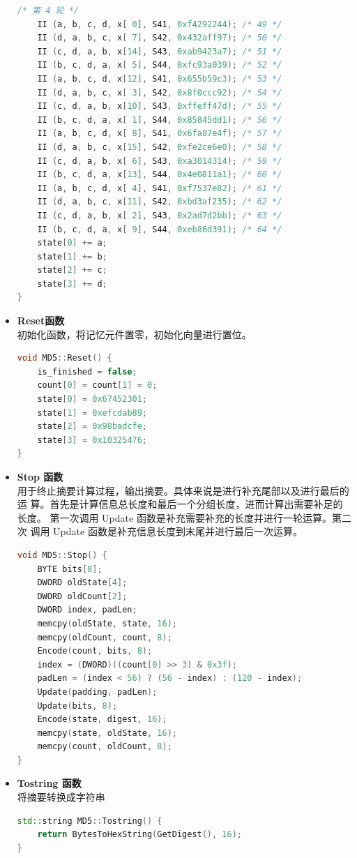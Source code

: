 \documentclass[UTF8,a4paper,10pt]{ctexart}
\begin{document}
\begin{itemize}
\begin{lstlisting}[language = C++]
	/* 第 4 轮 */
	II (a, b, c, d, x[ 0], S41, 0xf4292244); /* 49 */
	II (d, a, b, c, x[ 7], S42, 0x432aff97); /* 50 */
	II (c, d, a, b, x[14], S43, 0xab9423a7); /* 51 */
	II (b, c, d, a, x[ 5], S44, 0xfc93a039); /* 52 */
	II (a, b, c, d, x[12], S41, 0x655b59c3); /* 53 */
	II (d, a, b, c, x[ 3], S42, 0x8f0ccc92); /* 54 */
	II (c, d, a, b, x[10], S43, 0xffeff47d); /* 55 */
	II (b, c, d, a, x[ 1], S44, 0x85845dd1); /* 56 */
	II (a, b, c, d, x[ 8], S41, 0x6fa87e4f); /* 57 */
	II (d, a, b, c, x[15], S42, 0xfe2ce6e0); /* 58 */
	II (c, d, a, b, x[ 6], S43, 0xa3014314); /* 59 */
	II (b, c, d, a, x[13], S44, 0x4e0811a1); /* 60 */
	II (a, b, c, d, x[ 4], S41, 0xf7537e82); /* 61 */
	II (d, a, b, c, x[11], S42, 0xbd3af235); /* 62 */
	II (c, d, a, b, x[ 2], S43, 0x2ad7d2bb); /* 63 */
	II (b, c, d, a, x[ 9], S44, 0xeb86d391); /* 64 */
    state[0] += a;
    state[1] += b;
    state[2] += c;
    state[3] += d;
}
    \end{lstlisting}
    \item \textbf{Reset函数}\\
    初始化函数，将记忆元件置零，初始化向量进行置位。
    \begin{lstlisting}[language = C++]
void MD5::Reset() {
	is_finished = false;
	count[0] = count[1] = 0;
	state[0] = 0x67452301;
	state[1] = 0xefcdab89;
	state[2] = 0x98badcfe;
	state[3] = 0x10325476;
}
    \end{lstlisting}
    \item \textbf{Stop 函数}\\ 
    用于终止摘要计算过程，输出摘要。具体来说是进行补充尾部以及进行最后的运 算。首先是计算信息总长度和最后一个分组长度，进而计算出需要补足的长度。 第一次调用 Update 函数是补充需要补充的长度并进行一轮运算。第二次 调用 Update 函数是补充信息长度到末尾并进行最后一次运算。
    \begin{lstlisting}[language = C++]
void MD5::Stop() {
	BYTE bits[8];
	DWORD oldState[4];
	DWORD oldCount[2];
	DWORD index, padLen;
	memcpy(oldState, state, 16);
	memcpy(oldCount, count, 8);
	Encode(count, bits, 8);
	index = (DWORD)((count[0] >> 3) & 0x3f);
	padLen = (index < 56) ? (56 - index) : (120 - index);
	Update(padding, padLen);
	Update(bits, 8);
	Encode(state, digest, 16);
	memcpy(state, oldState, 16);
	memcpy(count, oldCount, 8);
}
    \end{lstlisting}
    \item \textbf{Tostring 函数}\\
    将摘要转换成字符串
    \begin{lstlisting}[language = C++]
std::string MD5::Tostring() {
	return BytesToHexString(GetDigest(), 16);
}


\end{lstlisting}
\end{itemize}
\end{document}
